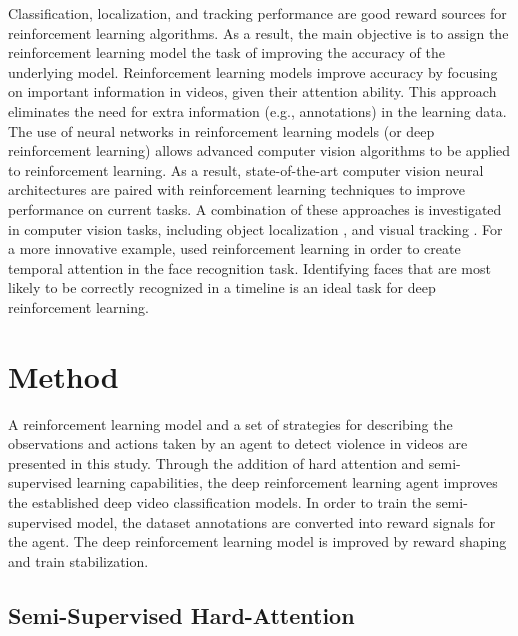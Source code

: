 \documentclass[review]{elsarticle}
\begin{document}
Classification, localization, and tracking performance are good reward sources for reinforcement learning algorithms. As a result, the main objective is to assign the reinforcement learning model the task of improving the accuracy of the underlying model. Reinforcement learning models improve accuracy by focusing on important information in videos, given their attention ability. This approach eliminates the need for extra information (e.g., annotations) in the learning data. The use of neural networks in reinforcement learning models (or deep reinforcement learning) allows advanced computer vision algorithms to be applied to reinforcement learning. As a result, state-of-the-art computer vision neural architectures are paired with reinforcement learning techniques to improve performance on current tasks. A combination of these approaches is investigated in computer vision tasks, including object localization \citep{wang2018multitask, jie2016tree, caicedo2015active, mathe2016reinforcement}, and visual tracking \citep{luo2019end, ren2018collaborative, yun2018action, zhong2019decision, cui2021remote}. For a more innovative example, \citet{rao2017attention} used reinforcement learning in order to create temporal attention in the face recognition task. Identifying faces that are most likely to be correctly recognized in a timeline is an ideal task for deep reinforcement learning.






\section{Method}
\label{method}


{A reinforcement learning model and a set of strategies for describing the observations and actions taken by an agent to detect violence in videos are presented in this study. Through the addition of hard attention and semi-supervised learning capabilities, the deep reinforcement learning agent improves the established deep video classification models. In order to train the semi-supervised model, the dataset annotations are converted into reward signals for the agent. The deep reinforcement learning model is improved by reward shaping and train stabilization.}

\subsection{Semi-Supervised Hard-Attention}
\label{3:1}
\end{document}
